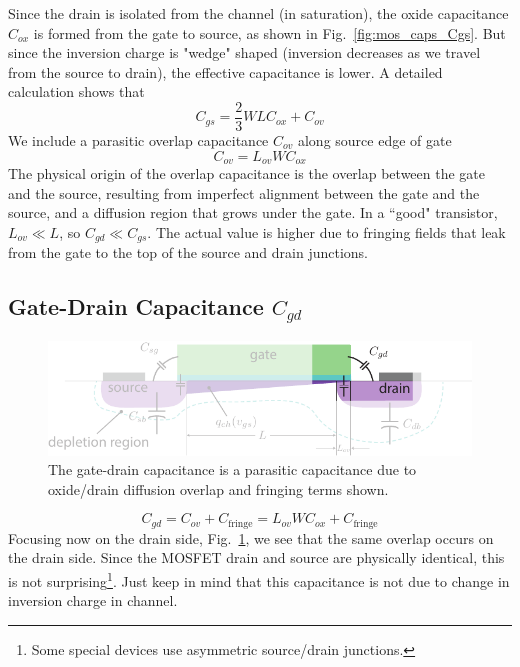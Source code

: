 Since the drain is isolated from the channel (in saturation), the oxide capacitance $C_{ox}$ is formed from the gate to source, as shown in Fig.~\ref{fig:mos_caps_Cgs}.  But since the inversion charge is "wedge" shaped (inversion decreases as we travel from the source to drain), the effective capacitance is lower.  A detailed calculation shows that
\begin{equation}
	C_{gs} = \frac{2}{3} W L C_{ox} + C_{ov} 
\end{equation} 
We include a parasitic overlap capacitance $C_{ov}$ along source edge of gate 
\begin{equation}
	C_{ov} = L_{ov} W C_{ox}
\end{equation}
The physical origin of the overlap capacitance is the overlap between the gate and the source, resulting from imperfect alignment between the gate and the source, and a diffusion region that grows under the gate.   In a ``good" transistor, $L_{ov} \ll L$, so $C_{gd} \ll C_{gs}$.  The actual value is higher due to fringing fields that leak from the gate to the top of the source and drain junctions.
\subsection{Gate-Drain Capacitance $C_{gd}$}
\begin{figure}[b]
\begin{center}
\includegraphics[width=.75\columnwidth]{mos_caps_Cgd}
\end{center}
\caption{The gate-drain capacitance is a parasitic capacitance due to oxide/drain diffusion overlap and fringing terms shown.}
\label{fig:mos_caps_Cgd}
\end{figure}

\begin{equation}
	C_{gd} = C_{ov} + C_{\text{fringe}} = L_{ov} W C_{ox} + C_{\text{fringe}}
\end{equation}
Focusing now on the drain side, Fig.~\ref{fig:mos_caps_Cgd}, we see that the same overlap occurs on the drain side.  Since the MOSFET drain and source are physically identical, this is not surprising\footnote{Some special devices use asymmetric source/drain junctions.}.  Just keep in mind that this capacitance is not due to change in inversion charge in channel.
